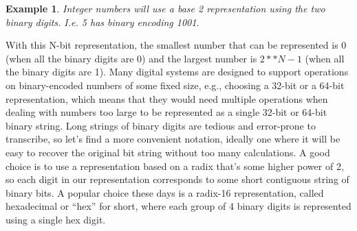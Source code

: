 \documentclass[a4paper,twoside]{article}
\newtheorem{example}[theorem]{Example}
\numberwithin{equation}{section}
\begin{document}
\begin{example}
    Integer numbers will use a base 2 representation using the two binary digits. I.e. 5  has binary
    encoding 1001.
\end{example}
With this N-bit representation, the smallest number that can be represented is 0
(when all the binary digits are 0) and the largest number is $2**N -1$ (when all the binary digits are 1).
 Many digital systems are designed to support operations on binary-encoded numbers of some fixed size, e.g.,
  choosing a 32-bit or a 64-bit representation, which means that they would need multiple operations when
   dealing with numbers too large to be represented as a single 32-bit or 64-bit binary string. \newline
Long strings of binary digits are tedious and error-prone to transcribe, so let's find a more
convenient notation, ideally one where it will be easy to recover the original bit string without
 too many calculations. A good choice is to use a representation based on a radix that's some higher power
  of 2, so each digit in our representation corresponds to some short contiguous string of binary bits.
  A popular choice these days is a radix-16 representation, called hexadecimal or “hex” for short, where
  each group of 4 binary digits is represented using a single hex digit.
\end{document}
